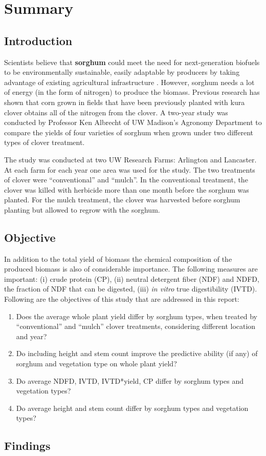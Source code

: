 \section*{Summary} \label{Sec_Summary}
\subsection*{Introduction}
Scientists believe that {\bf{sorghum}} could meet the need for next-generation biofuels to be environmentally sustainable, easily adaptable by producers by taking advantage of existing agricultural infrastructure \cite{Dweikat_etal_2012_BBB}. However, sorghum needs a lot of energy (in the form of nitrogen) to produce the biomass. Previous research has shown that corn grown in fields that have been previously planted with kura clover obtains all of the nitrogen from the clover. A two-year study was conducted by Professor Ken Albrecht of UW Madison's Agronomy Department to compare the yields of four varieties of sorghum when grown under two different types of clover treatment. 

The study was conducted at two UW Research Farms: Arlington and Lancaster. At each farm for each year one area was used for the study. The two treatments of clover were ``conventional'' and ``mulch''.  In the conventional treatment, the clover was killed with herbicide more than one month before the sorghum was planted. For the mulch treatment, the clover was harvested before sorghum planting but allowed to regrow with the sorghum. 

\subsection*{Objective}
In addition to the total yield of biomass the chemical composition of the produced biomass is also of considerable importance. The following measures are important: (i) crude protein (CP), (ii) neutral
detergent fiber (NDF) and NDFD, the fraction of NDF that can be digested, (iii) {\emph{in vitro}} true digestibility (IVTD). Following are the objectives of this study that are addressed in this report:
\begin{enumerate}
\item Does the average whole plant yield differ by sorghum types, when treated by ``conventional'' and ``mulch'' clover treatments, considering different location and year?
\item Do including height and stem count improve the predictive ability (if any) of sorghum and vegetation type on whole plant yield?
\item Do average NDFD, IVTD, IVTD*yield, CP differ by sorghum types and vegetation types?
\item Do average height and stem count differ by sorghum types and vegetation types?
\end{enumerate}

\subsection*{Findings}


